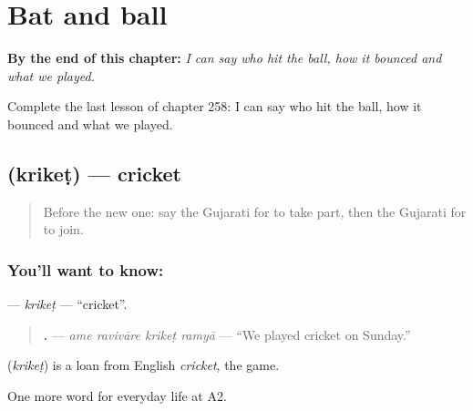 
\chapter{Bat and ball}
\label{ch:gu-bat-and-ball}

\begin{chapteropening}
\textbf{By the end of this chapter:} \emph{I can say who hit the ball, how it bounced and what we played.}

Complete the last lesson of chapter 258: I can say who hit the ball, how it bounced and what we played.
\end{chapteropening}

\section[\texorpdfstring{\gu{ક્રિકેટ} (krikeṭ)}{ક્રિકેટ (krikeṭ)}]{ (krikeṭ) — cricket}

\label{lesson:GU-C258-kriket}



\begin{quote}
Before the new one: say the Gujarati for to take part, then the Gujarati for to join.
\end{quote}

\subsection*{You'll want to know: }
\textbf{} — \emph{krikeṭ} — \textquotedblleft{}cricket\textquotedblright{}.

\begin{quote}
\textbf{   .} — \emph{ame ravivāre krikeṭ ramyā} — \textquotedblleft{}We played cricket on Sunday.\textquotedblright{}
\end{quote}

\begin{cousinweb}
\textbf{} (\emph{krikeṭ}) is a loan from English \emph{cricket}, the game.
\end{cousinweb}

\begin{grammarlens}[title={What you've built}]
One more word for everyday life at A2.
\end{grammarlens}

